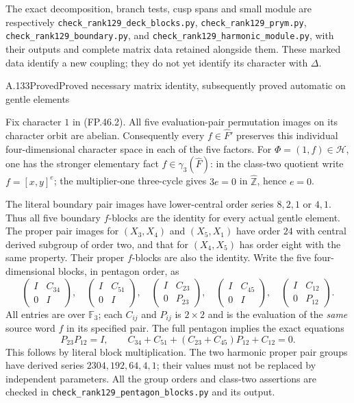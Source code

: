 The exact decomposition, branch tests, cusp spans and small
module are respectively
\texttt{check\_rank129\_deck\_blocks.py},
\texttt{check\_rank129\_prym.py},
\texttt{check\_rank129\_boundary.py}, and
\texttt{check\_rank129\_harmonic\_module.py}, with their
outputs and complete matrix data retained alongside them.
These marked data identify a new coupling; they do not yet
identify its character with $\Delta$.

\begin{statement}{A.133}{Proved}{Proved necessary matrix identity, subsequently proved automatic on gentle elements}
\end{statement}
Fix character $1$ in (FP.46.2). All five evaluation-pair
permutation images on its character orbit are abelian.
Consequently every $f\in\widehat F'$ preserves this individual
four-dimensional character space in each of the five factors.
For $\Phi=(1,f)\in\mathcal H$, one has the stronger elementary
fact $f\in\gamma_3(\widehat F)$: in the class-two quotient
write $f=[x,y]^e$; the multiplier-one three-cycle gives
$3e=0$ in $\widehat{\mathbb Z}$, hence $e=0$.

The literal boundary pair images have lower-central order
series $8,2,1$ or $4,1$. Thus all five boundary $f$-blocks
are the identity for every actual gentle element. The proper
pair images for $(X_3,X_4)$ and $(X_5,X_1)$ have order $24$
with central derived subgroup of order two, and that for
$(X_4,X_5)$ has order eight with the same property. Their
proper $f$-blocks are also the identity. Write the five
four-dimensional blocks, in pentagon order, as
\[
 \begin{pmatrix}I&C_{34}\\0&I\end{pmatrix},\quad
 \begin{pmatrix}I&C_{51}\\0&I\end{pmatrix},\quad
 \begin{pmatrix}I&C_{23}\\0&P_{23}\end{pmatrix},\quad
 \begin{pmatrix}I&C_{45}\\0&I\end{pmatrix},\quad
 \begin{pmatrix}I&C_{12}\\0&P_{12}\end{pmatrix}.
\]
All entries are over $\mathbb F_3$; each $C_{ij}$ and $P_{ij}$
is $2\times2$ and is the evaluation of the \emph{same} source
word $f$ in its specified pair. The full pentagon implies
the exact equations
\[
 \boxed{\quad P_{23}P_{12}=I,\qquad
 C_{34}+C_{51}+(C_{23}+C_{45})P_{12}+C_{12}=0.\quad}
 \tag{FP.47.1}
\]
This follows by literal block multiplication. The two harmonic
proper pair groups have derived series
$2304,192,64,4,1$; their values must not be replaced by
independent parameters. All the group orders and class-two
assertions are checked in
\texttt{check\_rank129\_pentagon\_blocks.py} and its output.

